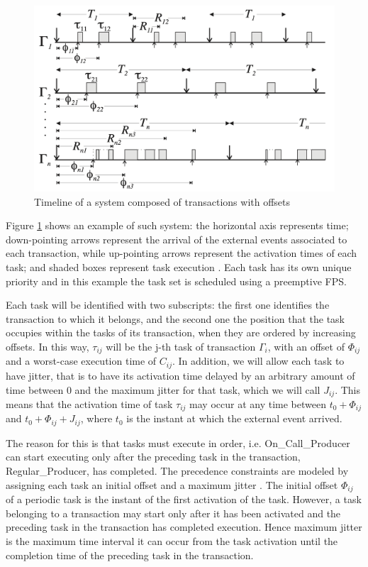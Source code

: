 \documentclass{article}
\begin{document}
\begin{figure}[!htbp]
\centering
\includegraphics[width=5in]{images/transactions}
\caption{Timeline of a system composed of transactions with offsets \cite{pessimistic-rma}}
\label{transactions}
\end{figure}

Figure \ref{transactions} shows an example of such system: the horizontal axis represents time; down-pointing arrows represent the arrival of the external events associated to each transaction, while up-pointing arrows represent the activation times of each task; and shaded boxes represent task execution \cite{pessimistic-rma}. Each task has its own unique priority and in this example the task set is scheduled using a preemptive FPS.

Each task will be identified with two subscripts: the first one identifies the transaction to which it belongs, and the second one the position that the task occupies within the tasks of its transaction, when they are ordered by increasing offsets. In this way, $\tau_{ij}$ will be the j-th task of transaction $\Gamma_i$, with an offset of $\Phi_{ij}$ and a worst-case execution time of $C_{ij}$. In addition, we will allow each task to have jitter, that is to have its activation time delayed by an arbitrary amount of time between 0 and the maximum jitter for that task, which we will call $J_{ij}$. This means that the activation time of task $\tau_{ij}$ may occur at any time between $t_0 + \Phi_{ij}$ and $t_0 + \Phi_{ij} + J_{ij}$, where $t_0$ is the instant at which the external event arrived.

The reason for this is that tasks must execute in order, i.e. On\_Call\_Producer can start executing only after the preceding task in the transaction, Regular\_Producer, has completed. The precedence constraints are modeled by assigning each task an initial offset and a maximum jitter \cite{tindell-offsets}. The initial offset $\Phi_{ij}$ of a periodic task is the instant of the first activation of the task. However, a task belonging to a transaction may start only after it has been activated and the preceding task in the transaction has completed execution. Hence maximum jitter is the maximum time interval it can occur from the task activation until the completion time of the preceding task in the transaction.
\end{document}
